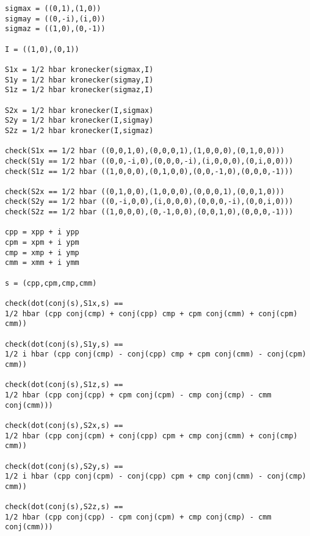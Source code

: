 {\footnotesize\begin{verbatim}
sigmax = ((0,1),(1,0))
sigmay = ((0,-i),(i,0))
sigmaz = ((1,0),(0,-1))

I = ((1,0),(0,1))

S1x = 1/2 hbar kronecker(sigmax,I)
S1y = 1/2 hbar kronecker(sigmay,I)
S1z = 1/2 hbar kronecker(sigmaz,I)

S2x = 1/2 hbar kronecker(I,sigmax)
S2y = 1/2 hbar kronecker(I,sigmay)
S2z = 1/2 hbar kronecker(I,sigmaz)

check(S1x == 1/2 hbar ((0,0,1,0),(0,0,0,1),(1,0,0,0),(0,1,0,0)))
check(S1y == 1/2 hbar ((0,0,-i,0),(0,0,0,-i),(i,0,0,0),(0,i,0,0)))
check(S1z == 1/2 hbar ((1,0,0,0),(0,1,0,0),(0,0,-1,0),(0,0,0,-1)))

check(S2x == 1/2 hbar ((0,1,0,0),(1,0,0,0),(0,0,0,1),(0,0,1,0)))
check(S2y == 1/2 hbar ((0,-i,0,0),(i,0,0,0),(0,0,0,-i),(0,0,i,0)))
check(S2z == 1/2 hbar ((1,0,0,0),(0,-1,0,0),(0,0,1,0),(0,0,0,-1)))

cpp = xpp + i ypp
cpm = xpm + i ypm
cmp = xmp + i ymp
cmm = xmm + i ymm

s = (cpp,cpm,cmp,cmm)

check(dot(conj(s),S1x,s) ==
1/2 hbar (cpp conj(cmp) + conj(cpp) cmp + cpm conj(cmm) + conj(cpm) cmm))

check(dot(conj(s),S1y,s) ==
1/2 i hbar (cpp conj(cmp) - conj(cpp) cmp + cpm conj(cmm) - conj(cpm) cmm))

check(dot(conj(s),S1z,s) ==
1/2 hbar (cpp conj(cpp) + cpm conj(cpm) - cmp conj(cmp) - cmm conj(cmm)))

check(dot(conj(s),S2x,s) ==
1/2 hbar (cpp conj(cpm) + conj(cpp) cpm + cmp conj(cmm) + conj(cmp) cmm))

check(dot(conj(s),S2y,s) ==
1/2 i hbar (cpp conj(cpm) - conj(cpp) cpm + cmp conj(cmm) - conj(cmp) cmm))

check(dot(conj(s),S2z,s) ==
1/2 hbar (cpp conj(cpp) - cpm conj(cpm) + cmp conj(cmp) - cmm conj(cmm)))
\end{verbatim}}


